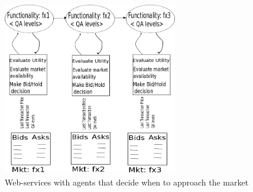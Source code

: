 \documentclass[10pt,journal,compsoc]{IEEEtran}
\begin{document}
\begin{figure} 
    \centering
    \includegraphics[width=3in, height=3in]{drawings/buyers-and-market.png}
  \caption{Web-services with agents that decide when to approach the market}
 \label{marketplace}
 \end{figure}
  


\end{document}
